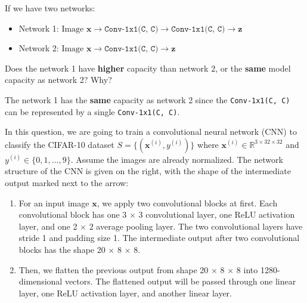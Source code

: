 \documentclass{article}
\newcommand{\R}{\mathbb{R}}
\newcommand{\x}{\mathbf{x}}
\newcommand{\z}{\mathbf{z}}
\begin{document}
\begin{probset}
\begin{prob}
\begin{subprobset}
\begin{subprob}
        If we have two networks:

        \begin{itemize}
            \item Network 1: $\text{Image } \x \to \texttt{Conv-1x1(C, C)} \to \texttt{Conv-1x1(C, C)} \to \z$
            \item Network 2: $\text{Image } \x \to \texttt{Conv-1x1(C, C)} \to \z$
        \end{itemize}

        Does the network 1 have \textbf{higher} capacity than network 2, or the \textbf{same} model capacity as network 2? Why?

        \begin{soln}
            The network 1 has the \textbf{same} capacity as network 2 since the \texttt{Conv-1x1(C, C)} can be represented by a single \texttt{Conv-1x1(C, C)}.
        \end{soln}
    \end{subprob}
    \end{subprobset}
\end{prob}

\newpage

\begin{prob}
    \noindent
    \begin{minipage}[c]{0.62\textwidth}
    In this question, we are going to train a convolutional neural network (CNN) to classify the CIFAR-10 dataset $S = \{(\x^{(i)}, y^{(i)})\}$ where $\x^{(i)} \in \R^{3 \times 32 \times 32}$ and $y^{(i)} \in \{0, 1, ..., 9\}$. Assume the images are already normalized. The network structure of the CNN is given on the right, with the shape of the intermediate output marked next to the arrow:

    \begin{enumerate}
        \item For an input image $\x$, we apply two convolutional blocks at first. Each convolutional block has one 3 $\times$ 3 convolutional layer, one ReLU activation layer, and one 2 $\times$ 2 average pooling layer. The two convolutional layers have stride 1 and padding size 1. The intermediate output after two convolutional blocks has the shape 20 $\times$ 8 $\times$ 8.
        \item Then, we flatten the previous output from shape 20 $\times$ 8 $\times$ 8 into 1280-dimensional vectors. The flattened output will be passed through one linear layer, one ReLU activation layer, and another linear layer.
    \end{enumerate}


\end{minipage}
\end{prob}
\end{probset}
\end{document}
